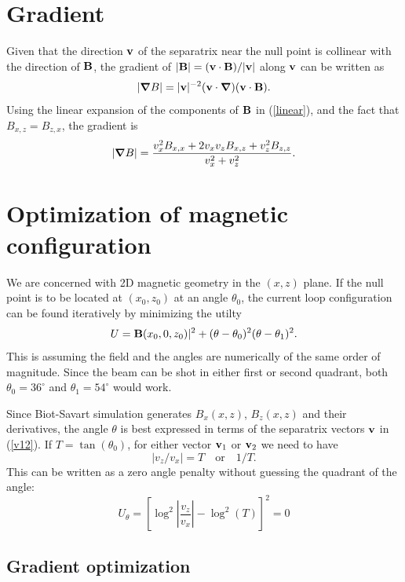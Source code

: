 \documentclass[10pt]{article}
\newcommand{\bfB}{{\bf B}}
\newcommand{\bfv}{{\bf v}}
\newcommand{\bfna}{{\mbox{\boldmath $\bf\nabla$}}}
\begin{document}
\section{Gradient}

Given that the direction $\bfv$ of the separatrix near the null point
is collinear with the direction of $\bfB$, the gradient of
$|\bfB|=(\bfv\cdot\bfB)/|\bfv|$ along $\bfv$ can be written as
\begin{equation}
|\bfna B| = |\bfv|^{-2}(\bfv\cdot\bfna)(\bfv\cdot\bfB).
\end{equation}
Using the linear expansion of the components of $\bfB$ in
(\ref{linear}), and the fact that $B_{x,z}=B_{z,x}$, the gradient is
\begin{equation}
  |\bfna B|=\frac{v_x^2B_{x,x} + 2v_xv_zB_{x,z}+v_z^2B_{z,z}}{v_x^2+v_z^2}.
  \label{grad}
\end{equation}

\section{Optimization of magnetic configuration}

We are concerned with 2D magnetic geometry in the $(x,z)$ plane.  If
the null point is to be located at $(x_0, z_0)$ at an angle
$\theta_0$, the current loop configuration can be found iteratively by
minimizing the utilty
\begin{equation}
  U = \bfB(x_0,0,z_0)|^2 + (\theta-\theta_0)^2(\theta-\theta_1)^2.
\end{equation}
This is assuming the field and the angles are numerically of the same
order of magnitude.
Since the beam can be shot in either first or second quadrant, both
$\theta_0=36^\circ$ and $\theta_1=54^\circ$ would work.

Since Biot-Savart simulation generates $B_x(x,z)$, $B_z(x,z)$ and
their derivatives, the angle $\theta$ is best expressed in terms of
the separatrix vectors $\bfv$ in (\ref{v12}).  If $T=\tan(\theta_0)$,
for either vector $\bfv_1$ or $\bfv_2$ we need to have
\begin{equation}
  |v_z/v_x| = T\quad\text{or}\quad1/T.
\end{equation}
This can be written as a zero angle penalty without guessing the
quadrant of the angle:
\begin{equation}
  U_\theta=\left[\log^2\left|\frac{v_z}{v_x}\right| - \log^2(T)\right]^2 = 0
\end{equation}

\subsection{Gradient optimization}
\end{document}
